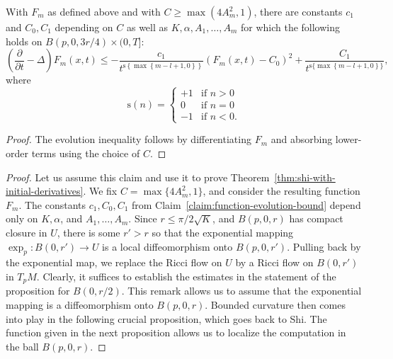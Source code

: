 \begin{claim}\label{claim:function-evolution-bound}
\label{Fm}
 With $F_m$ as defined above and with $C\ge \max(4A^2_m,1)$,
there are constants $c_1$ and $C_0,C_1$ depending on $C$ as well as
$K,\alpha,A_1,\ldots,A_m$ for which the following holds on
$B(p,0,3r/4)\times (0,T]$:
$$
\left(  \frac{\partial}{\partial t}-\Delta\right)
F_{m}(x,t)\leq-\frac {c_1}{t^{\mathrm{s}\left\{  \max\left\{
m-l+1,0\right\}  \right\} }}\left( F_{m}(x,t)-C_0\right)
^{2}+\frac{C_1}{t^{\mathrm{s}\{\max\left\{ m-l+1,0\right\} \} }},
$$
where
$$\mathrm{s}(n)=\begin{cases} +1 & \text{if } n>0 \\ 0 & \text{if }n=0 \\ -1&
\text{if }n<0.\end{cases}$$
\end{claim}

\begin{proof}
\sketch The evolution inequality follows by differentiating $F_m$ and
absorbing lower-order terms using the choice of $C$.
\end{proof}

\begin{proof}
\sketch Let us assume this claim and use it to prove Theorem~\ref{thm:shi-with-initial-derivatives}. We fix
$C=\max\{4A_m^2,1\}$, and consider the resulting function $F_m$. The
constants $c_1,C_0,C_1$ from Claim~\ref{claim:function-evolution-bound} depend only on $K,\alpha$, and
$A_1,\ldots,A_m$. Since $r\le \pi/2\sqrt{K}$, and $B(p,0,r)$ has
compact closure in $U$, there is some $r'>r$ so that the exponential
mapping $\exp_p\colon B(0,r')\to U$ is a local diffeomorphism
onto $B(p,0,r')$. Pulling back by the exponential map, we  replace
the Ricci flow on $U$ by a Ricci flow on $B(0,r')$ in $T_pM$.
Clearly, it suffices to establish the estimates in the statement of
the proposition for $B(0,r/2)$. This remark allows us to assume that
the exponential mapping is a diffeomorphism onto $B(p,0,r)$. Bounded
curvature then comes into play in the following crucial proposition,
which goes back to Shi. The function given in the next proposition allows us to localize
the computation in the ball $B(p,0,r)$.
\end{proof}

